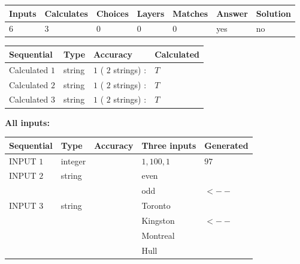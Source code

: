 \documentclass[12pt]{article}
\begin{document}
   
\noindent\begin{tabular}{|l|l|l|l|l|l|l|}
 \hline
Inputs & Calculates & Choices & Layers & Matches & Answer & Solution \\ \hline
           6 & 
           3 & 
           0
  & 
           0 & 
           0 & 
  yes & 
  no 
  \\ \hline
 \end{tabular}
   
   
   
   
\noindent{}
   
   
  
  
\noindent\begin{tabular}{|l|l|l|l|}
\hline
 Sequential & Type & Accuracy & Calculated \\ 
\hline
 
 
  Calculated $           1$ & string & $           1 $ ( $          2 $ strings)
 : 
 & $T$
 \\  \hline  
 
 
  Calculated $           2$ & string & $           1 $ ( $          2 $ strings)
 : 
 & $T$
 \\  \hline  
 
 
  Calculated $           3$ & string & $           1 $ ( $          2 $ strings)
 : 
 & $T$
 \\  \hline  
 \end{tabular}
   
   
   
   
\noindent\vspace{0.1in}\hspace{-0.08in} {\textbf{\Large{All inputs: }}}
   
   
  
  
\noindent\begin{tabular}{|l|l|l|l|l|}
\hline
 Sequential & Type & Accuracy & Three inputs & Generated \\ 
\hline
 
 
  INPUT $           1$ & integer &  & $
 1
 , 
 100
 , 
 1
 $ & $ 97 $ 
 \\  \hline  
 
 
  INPUT $           2$ & string & & 
 even & 
  \\
  & & & 
 odd & 
  $ <-- $ 
 \\  \hline  
 
 
  INPUT $           3$ & string & & 
 Toronto & 
  \\
  & & & 
 Kingston & 
  $ <-- $ 
  \\
  & & & 
 Montreal & 
  \\
  & & & 
 Hull & 
 \\  \hline  
 \end{tabular}
   
\end{document}
